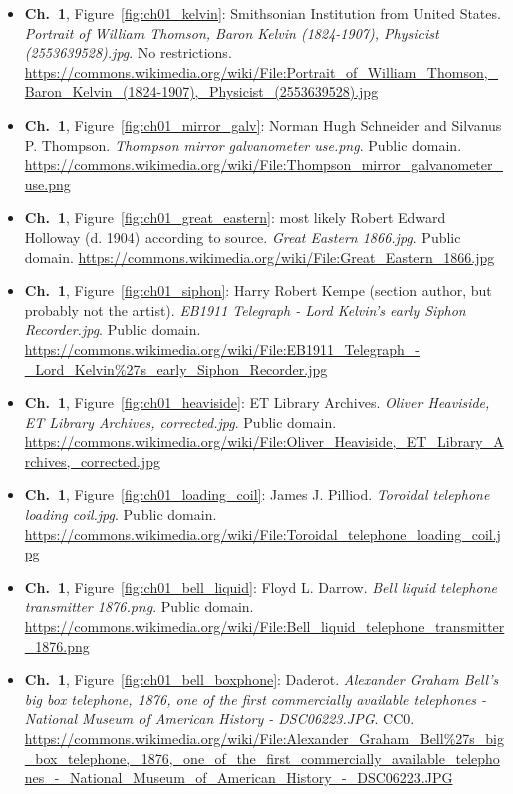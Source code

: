 \begin{small}
\begin{itemize}[leftmargin=0pt,itemsep=2pt,label={}]
\item \textbf{Ch.~1}, Figure~\ref{fig:ch01_kelvin}: Smithsonian Institution from United States. \emph{Portrait of William Thomson, Baron Kelvin (1824-\allowbreak{}1907), Physicist (2553639528).\allowbreak{}jpg}. No restrictions. \url{https://commons.wikimedia.org/wiki/File:Portrait_of_William_Thomson,_Baron_Kelvin_(1824-1907),_Physicist_(2553639528).jpg}
\item \textbf{Ch.~1}, Figure~\ref{fig:ch01_mirror_galv}: Norman Hugh Schneider and Silvanus P. Thompson. \emph{Thompson mirror galvanometer use.\allowbreak{}png}. Public domain. \url{https://commons.wikimedia.org/wiki/File:Thompson_mirror_galvanometer_use.png}
\item \textbf{Ch.~1}, Figure~\ref{fig:ch01_great_eastern}: most likely Robert Edward Holloway (d. 1904) according to source. \emph{Great Eastern 1866.\allowbreak{}jpg}. Public domain. \url{https://commons.wikimedia.org/wiki/File:Great_Eastern_1866.jpg}
\item \textbf{Ch.~1}, Figure~\ref{fig:ch01_siphon}: Harry Robert Kempe (section author, but probably not the artist). \emph{EB1911 Telegraph -\allowbreak{} Lord Kelvin's early Siphon Recorder.\allowbreak{}jpg}. Public domain. \url{https://commons.wikimedia.org/wiki/File:EB1911_Telegraph_-_Lord_Kelvin%27s_early_Siphon_Recorder.jpg}
\item \textbf{Ch.~1}, Figure~\ref{fig:ch01_heaviside}: ET Library Archives. \emph{Oliver Heaviside, ET Library Archives, corrected.\allowbreak{}jpg}. Public domain. \url{https://commons.wikimedia.org/wiki/File:Oliver_Heaviside,_ET_Library_Archives,_corrected.jpg}
\item \textbf{Ch.~1}, Figure~\ref{fig:ch01_loading_coil}: James J. Pilliod. \emph{Toroidal telephone loading coil.\allowbreak{}jpg}. Public domain. \url{https://commons.wikimedia.org/wiki/File:Toroidal_telephone_loading_coil.jpg}
\item \textbf{Ch.~1}, Figure~\ref{fig:ch01_bell_liquid}: Floyd L. Darrow. \emph{Bell liquid telephone transmitter 1876.\allowbreak{}png}. Public domain. \url{https://commons.wikimedia.org/wiki/File:Bell_liquid_telephone_transmitter_1876.png}
\item \textbf{Ch.~1}, Figure~\ref{fig:ch01_bell_boxphone}: Daderot. \emph{Alexander Graham Bell's big box telephone, 1876, one of the first commercially available telephones -\allowbreak{} National Museum of American History -\allowbreak{} DSC06223.\allowbreak{}JPG}. CC0. \url{https://commons.wikimedia.org/wiki/File:Alexander_Graham_Bell%27s_big_box_telephone,_1876,_one_of_the_first_commercially_available_telephones_-_National_Museum_of_American_History_-_DSC06223.JPG}

\end{itemize}
\end{small}
